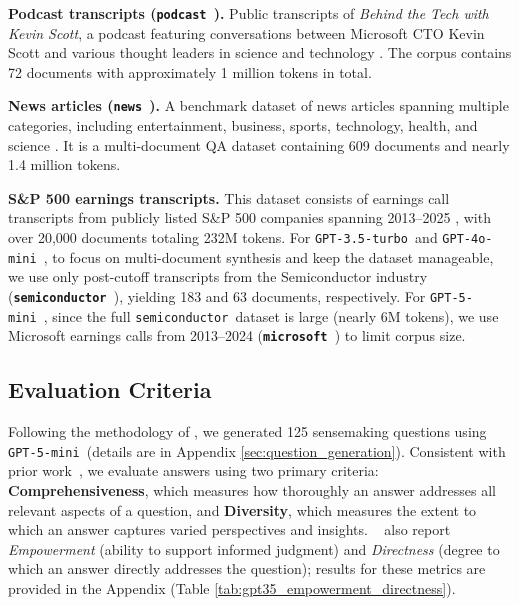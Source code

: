 \documentclass[sigconf]{acmart}
\newcommand{\threepointfive}{\texttt{GPT-3.5-turbo\,}}
\newcommand{\four}{\texttt{GPT-4o-mini\,}}
\newcommand{\five}{\texttt{GPT-5-mini\,}}
\newcommand{\podcast}{\texttt{podcast\,}}
\newcommand{\news}{\texttt{news\,}}
\newcommand{\semi}{\texttt{semiconductor\,}}
\newcommand{\ms}{\texttt{microsoft\,}}
\begin{document}
 \noindent \textbf{Podcast transcripts (\podcast).} Public transcripts of \textit{Behind the Tech with Kevin Scott}, a podcast featuring conversations between Microsoft CTO Kevin Scott and various thought leaders in science and technology \cite{Scott24}. The corpus contains 72 documents with approximately 1 million tokens in total.
     
\noindent\textbf{News articles (\news).} A benchmark dataset of news articles spanning multiple categories, including entertainment, business, sports, technology, health, and science \cite{tang24}. 
  It is a multi-document QA dataset containing 609 documents and nearly 1.4 million tokens.
  
 \noindent\textbf{S\&P 500 earnings transcripts.} This dataset consists of earnings call transcripts from publicly listed S\&P 500 companies spanning 2013–2025 \cite{ca25}, with over 20,000 documents totaling 232M tokens.
For \threepointfive and \four, to focus on multi-document synthesis and keep the dataset manageable, we use only post-cutoff transcripts from the Semiconductor industry ({\bf \semi}), yielding 183 and 63 documents, respectively. For \five, since the full \semi dataset is large (nearly 6M tokens), we use Microsoft earnings calls from 2013–2024 ({\bf \ms}) to limit corpus size.


\subsection{Evaluation Criteria}
Following the methodology of \cite{edge24}, we generated 125 sensemaking questions using \five (details are in Appendix \ref{sec:question_generation}).  
Consistent with prior work~\cite{edge24,tiwari25,kim25}, we evaluate answers using two primary criteria: \textbf{Comprehensiveness}, which measures how thoroughly an answer addresses all relevant aspects of a question, and \textbf{Diversity}, which measures the extent to which an answer captures varied perspectives and insights.  
\citeauthor{edge24}~\cite{edge24} also report \textit{Empowerment} (ability to support informed judgment) and \textit{Directness} (degree to which an answer directly addresses the question); results for these metrics are provided in the %
Appendix (Table \ref{tab:gpt35_empowerment_directness}).  
\end{document}
